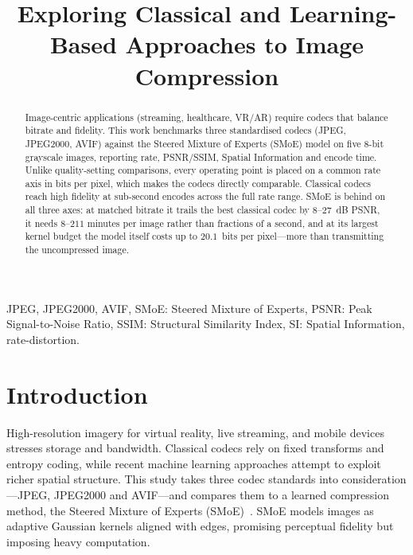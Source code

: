 \documentclass[conference]{IEEEtran}
\begin{document}
\title{Exploring Classical and Learning-Based Approaches to Image Compression}

\author{
}

\maketitle

\begin{abstract}
Image-centric applications (streaming, healthcare, VR/AR) require codecs that balance bitrate and fidelity. This work benchmarks three standardised codecs (JPEG, JPEG2000, AVIF) against the Steered Mixture of Experts (SMoE) model on five 8-bit grayscale images, reporting rate, PSNR/SSIM, Spatial Information and encode time. Unlike quality-setting comparisons, every operating point is placed on a common rate axis in bits per pixel, which makes the codecs directly comparable. Classical codecs reach high fidelity at sub-second encodes across the full rate range. SMoE is behind on all three axes: at matched bitrate it trails the best classical codec by $8$--$27$~dB PSNR, it needs $8$--$211$ minutes per image rather than fractions of a second, and at its largest kernel budget the model itself costs up to $20.1$~bits per pixel---more than transmitting the uncompressed image.
\end{abstract}

\begin{IEEEkeywords}
JPEG, JPEG2000, AVIF, SMoE: Steered Mixture of Experts, PSNR: Peak Signal-to-Noise Ratio, SSIM: Structural Similarity Index, SI: Spatial Information, rate-distortion.\@
\end{IEEEkeywords}

\section{Introduction}
High-resolution imagery for virtual reality, live streaming, and mobile devices stresses storage and bandwidth. Classical codecs rely on fixed transforms and entropy coding, while recent machine learning approaches attempt to exploit richer spatial structure. This study takes three codec standards into consideration---JPEG, JPEG2000 and AVIF---and compares them to a learned compression method, the Steered Mixture of Experts (SMoE)~\cite{bochinski2018}. SMoE models images as adaptive Gaussian kernels aligned with edges, promising perceptual fidelity but imposing heavy computation.
\end{document}
